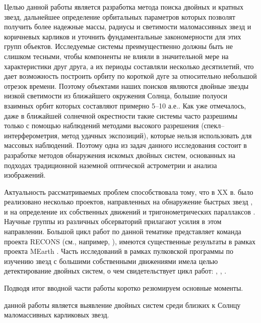 Целью данной работы является разработка метода поиска двойных и кратных звезд, дальнейшее определение орбитальных параметров которых позволят получить более надежные массы, радиусы и светимости маломассивных звезд и коричневых карликов и уточнить фундаментальные закономерности для этих групп объектов. Исследуемые системы преимущественно должны быть не слишком тесными, чтобы компоненты не влияли в значительной мере на характеристики друг друга, а их периоды составляли несколько десятилетий, что дает возможность построить орбиту по короткой дуге за относительно небольшой отрезок времени. Поэтому объектами наших поисков являются двойные звезды низкой светимости из ближайшего окружения Солнца, большие полуоси взаимных орбит которых составляют примерно 5--10 а.е.. Как уже отмечалось, даже в ближайшей солнечной окрестности такие системы часто разрешимы только  с помощью наблюдений методами высокого разрешения  (спекл--интерферометрия, метод удачных экспозиций), которые нельзя использовать для массовых наблюдений. Поэтому одна из задач данного исследования состоит в разработке методов обнаружения искомых двойных систем, основанных на подходах традиционной наземной оптической астрометрии и анализа изображений.

Актуальность рассматриваемых проблем способствовала тому, что в XX в. было реализовано несколько проектов, направленных на обнаружение быстрых звезд \cite{1955AJ.....60..274D}, \cite{1979nlcs.book.....L} и на определение их собственных движений и тригонометрических параллаксов \cite{1995gcts.book.....V}. Научные группы из различных обсерваторий прилагают усилия в этом направлении. Большой цикл работ по данной тематике представляет команда проекта RECONS (см., например, \cite{2017AJ....153...14W}), имеются существенные результаты в рамках проекта MEarth \cite{2017ApJ...836..124D}. Часть исследований в рамках пулковской программы по изучению звезд с большими собственными движениями имела целью детектирование двойных систем, о чем свидетельствует цикл работ: \cite{2011AstL...37..420K}, \cite{2015AstL...41..833K}, \cite{2016AstL...42..686K}.

\newpage

Подводя итог вводной части работы коротко резюмируем основные моменты.

{\aim} данной работы является выявление двойных систем среди близких к Солнцу маломассивных карликовых звезд. 

